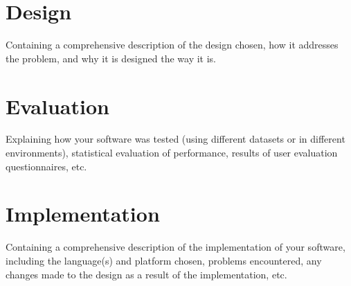 \chapter{Design}

Containing a comprehensive description of the design chosen, how it addresses the problem, and why it is designed the way it is.

\chapter{Evaluation}

Explaining how your software was tested (using different datasets or in different environments), statistical evaluation of performance, results of user evaluation questionnaires, etc.

\chapter{Implementation}

Containing a comprehensive description of the implementation of your software, including the language(s) and platform chosen, problems encountered, any changes made to the design as a result of the implementation, etc.
